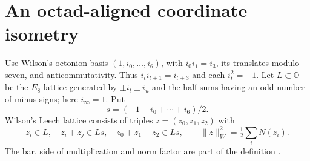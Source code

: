 \section{An octad-aligned coordinate isometry}
Use Wilson's octonion basis $(1,i_0,\ldots,i_6)$, with $i_0i_1=i_3$, its translates modulo seven, and anticommutativity. Thus $i_ti_{t+1}=i_{t+3}$ and each $i_t^2=-1$. Let $L\subset\mathbb O$ be the $E_8$ lattice generated by $\pm i_t\pm i_u$ and the half-sums having an odd number of minus signs; here $i_\infty=1$. Put
\[
s=(-1+i_0+\cdots+i_6)/2.
\]
Wilson's Leech lattice consists of triples $z=(z_0,z_1,z_2)$ with
\begin{equation}\label{eq:wilson}
z_i\in L,\quad z_i+z_j\in L\bar s,\quad z_0+z_1+z_2\in Ls,
\qquad \|z\|_W^2=\tfrac12\sum_iN(z_i).
\end{equation}
The bar, side of multiplication and norm factor are part of the definition \cite[Sections 2--4]{wilson}.

